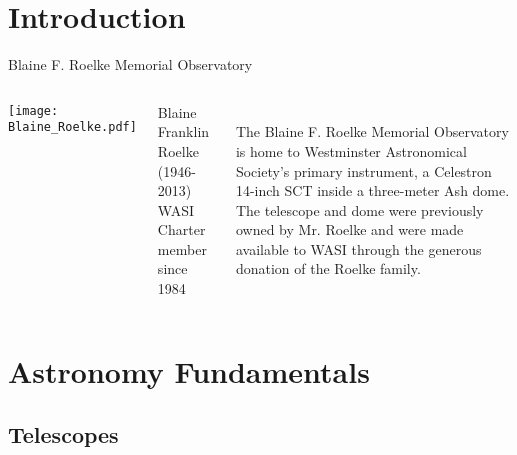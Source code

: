 

\section*{Introduction}

\begin{frame}[t]{Blaine F. Roelke Memorial Observatory}
    \begin{columns}[T]
      \centering
      \texttt{[image: Blaine\_Roelke.pdf]}

      \footnotesize Blaine Franklin Roelke (1946-2013) \\
        WASI Charter member since 1984
 
      \ \\
      The Blaine F. Roelke Memorial Observatory is home to Westminster
      Astronomical Society's primary instrument, a Celestron 14-inch SCT inside a
      three-meter Ash dome. \\[1ex]
      The telescope and dome were previously owned by Mr.  Roelke and were made
      available to WASI through the generous donation of the Roelke family.
    \end{columns}
\end{frame}


\section{Astronomy Fundamentals}

\subsection{Telescopes}

\begin{frame}{\insertsubsectionhead}
  \centering
\end{frame}


